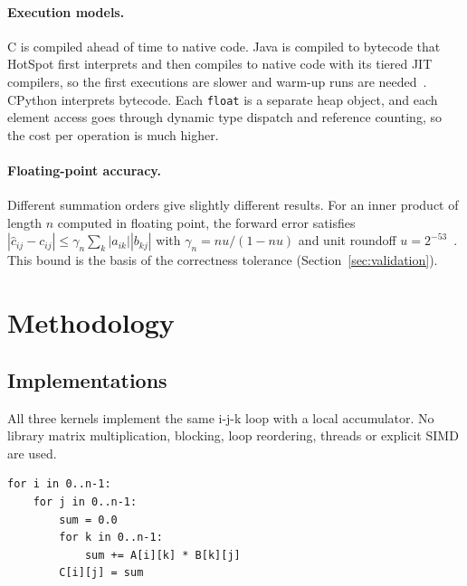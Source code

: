 \documentclass[11pt,a4paper]{article}
\begin{document}
\paragraph{Execution models.} C is compiled ahead of time to native code. Java is compiled to
bytecode that HotSpot first interprets and then compiles to native code with its tiered JIT
compilers, so the first executions are slower and warm-up runs are needed~\cite{georges2007}.
CPython interprets bytecode. Each \texttt{float} is a separate heap object, and each element
access goes through dynamic type dispatch and reference counting, so the cost per operation is much
higher.

\paragraph{Floating-point accuracy.} Different summation orders give slightly different results.
For an inner product of length $n$ computed in floating point, the forward error satisfies
$|\hat{c}_{ij} - c_{ij}| \le \gamma_n \sum_k |a_{ik}||b_{kj}|$ with
$\gamma_n = nu/(1-nu)$ and unit roundoff $u = 2^{-53}$~\cite{higham2002}. This bound is the basis of
the correctness tolerance (Section~\ref{sec:validation}).

\section{Methodology}

\subsection{Implementations}
All three kernels implement the same i-j-k loop with a local accumulator. No library matrix
multiplication, blocking, loop reordering, threads or explicit SIMD are used.

\begin{lstlisting}
for i in 0..n-1:
    for j in 0..n-1:
        sum = 0.0
        for k in 0..n-1:
            sum += A[i][k] * B[k][j]
        C[i][j] = sum
\end{lstlisting}
\end{document}
